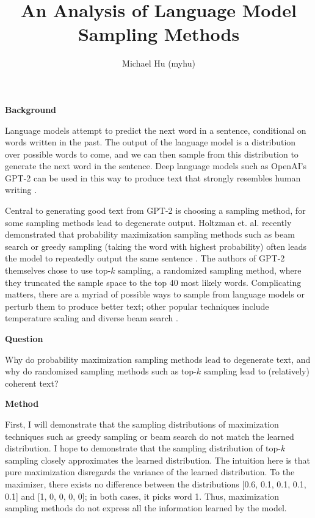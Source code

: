 \documentclass[11pt]{extarticle}
\title{An Analysis of Language Model Sampling Methods \vspace{-1ex}}
\author{Michael Hu (myhu)}
\date{}
\begin{document}
\maketitle


{\large \textbf{Background}}

Language models attempt to predict the next word in a sentence, conditional on words written in the past. The output of the language model is a distribution over possible words to come, and we can then sample from this distribution to generate the next word in the sentence. Deep language models such as OpenAI's GPT-2 can be used in this way to produce text that strongly resembles human writing \cite{radford2019language}. 

Central to generating good text from GPT-2 is choosing a sampling method, for some sampling methods lead to degenerate output. Holtzman et. al. recently demonstrated that probability maximization sampling methods such as beam search or greedy sampling (taking the word with highest probability) often leads the model to repeatedly output the same sentence \cite{holtzman2019curious}. The authors of GPT-2 themselves chose to use top-$k$ sampling, a randomized sampling method, where they truncated the sample space to the top 40 most likely words. Complicating matters, there are a myriad of possible ways to sample from language models or perturb them to produce better text; other popular techniques include temperature scaling and diverse beam search \cite{guo2017calibration} \cite{vijayakumar2016diverse}.

{\large \textbf{Question}}

Why do probability maximization sampling methods lead to degenerate text, and why do randomized sampling methods such as top-$k$ sampling lead to (relatively) coherent text?

{\large \textbf{Method}}

First, I will demonstrate that the sampling distributions of maximization techniques such as greedy sampling or beam search do not match the learned distribution. I hope to demonstrate that the sampling distribution of top-$k$ sampling closely approximates the learned distribution. The intuition here is that pure maximization disregards the variance of the learned distribution. To the maximizer, there exists no difference between the distributions [0.6, 0.1, 0.1, 0.1, 0.1] and [1, 0, 0, 0, 0]; in both cases, it picks word 1. Thus, maximization sampling methods do not express all the information learned by the model.
\end{document}
